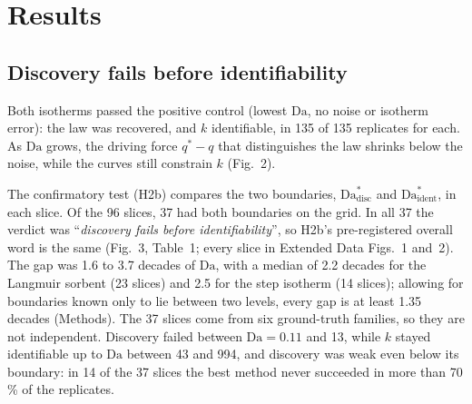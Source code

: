 \documentclass[11pt]{article}
\newcommand{\Da}{\mathrm{Da}}
\newcommand{\qs}{q^{*}}
\newcommand{\verdict}[1]{``\textit{#1}''}
\begin{document}
\section*{Results}

\subsection*{Discovery fails before identifiability}
Both isotherms passed the positive control (lowest $\Da$, no noise or isotherm error): the law
was recovered, and $k$ identifiable, in 135 of 135 replicates for each. As $\Da$ grows, the
driving force $\qs - q$ that distinguishes the law shrinks below the noise, while the curves still
constrain $k$ (Fig.~2).

The confirmatory test (H2b) compares the two boundaries, $\Da^{*}_{\mathrm{disc}}$ and
$\Da^{*}_{\mathrm{ident}}$, in each slice. Of the 96 slices, 37 had both
boundaries on the grid. In all 37 the verdict was \verdict{discovery fails before
identifiability}, so H2b's pre-registered overall word is the same (Fig.~3, Table~1; every slice
in Extended Data Figs.~1 and~2). The gap was 1.6 to 3.7 decades of $\Da$, with a median of 2.2
decades for the Langmuir sorbent (23 slices) and 2.5 for the step isotherm (14 slices); allowing
for boundaries known only to lie between two levels, every gap is at least 1.35 decades (Methods).
The 37 slices come from six ground-truth families, so they are not independent. Discovery failed between $\Da = 0.11$ and 13, while $k$ stayed identifiable up to $\Da$
between 43 and 994, and discovery was weak even below its boundary: in 14 of the 37 slices the best
method never succeeded in more than 70\,\% of the replicates.
\end{document}
